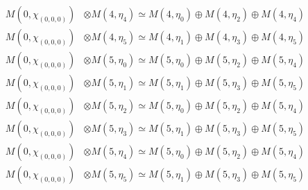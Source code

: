 \begin{align*}
M(0,\chi_{(0,0,0)}) &\otimes M(4,\eta_{4}) \simeq M(4,\eta_{0}) \oplus M(4,\eta_{2}) \oplus M(4,\eta_{4}) \\
M(0,\chi_{(0,0,0)}) &\otimes M(4,\eta_{5}) \simeq M(4,\eta_{1}) \oplus M(4,\eta_{3}) \oplus M(4,\eta_{5}) \\
M(0,\chi_{(0,0,0)}) &\otimes M(5,\eta_{0}) \simeq M(5,\eta_{0}) \oplus M(5,\eta_{2}) \oplus M(5,\eta_{4}) \\
M(0,\chi_{(0,0,0)}) &\otimes M(5,\eta_{1}) \simeq M(5,\eta_{1}) \oplus M(5,\eta_{3}) \oplus M(5,\eta_{5}) \\
M(0,\chi_{(0,0,0)}) &\otimes M(5,\eta_{2}) \simeq M(5,\eta_{0}) \oplus M(5,\eta_{2}) \oplus M(5,\eta_{4}) \\
M(0,\chi_{(0,0,0)}) &\otimes M(5,\eta_{3}) \simeq M(5,\eta_{1}) \oplus M(5,\eta_{3}) \oplus M(5,\eta_{5}) \\
M(0,\chi_{(0,0,0)}) &\otimes M(5,\eta_{4}) \simeq M(5,\eta_{0}) \oplus M(5,\eta_{2}) \oplus M(5,\eta_{4}) \\
M(0,\chi_{(0,0,0)}) &\otimes M(5,\eta_{5}) \simeq M(5,\eta_{1}) \oplus M(5,\eta_{3}) \oplus M(5,\eta_{5}) \\
\end{align*}

